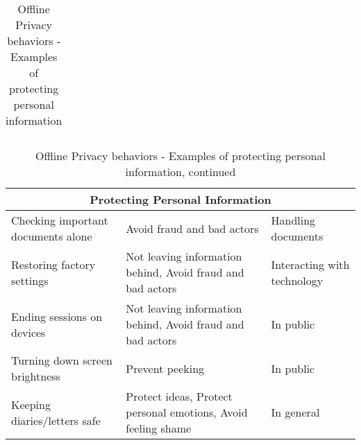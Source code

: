 \begin{table}[H]
\begin{tabular}{ |p{5cm}||p{6cm}|p{4cm}|  }
\end{tabular}
\caption{Offline Privacy behaviors - Examples of protecting personal information}
    \label{tab:meng_t1}
\end{table}

\begin{table}[H]
    \centering
\begin{tabular}{ |p{5cm}||p{6cm}|p{4cm}|  }
\hline
\multicolumn{3}{|c|}{Protecting Personal Information} \\
\hline
\hline
    Checking important documents alone & Avoid fraud and bad actors & Handling documents \\
\hline
    Restoring factory settings & Not leaving information behind, Avoid fraud and bad actors & Interacting with technology \\
\hline
    Ending sessions on devices & Not leaving information behind, Avoid fraud and bad actors & In public \\
\hline
    Turning down screen brightness & Prevent peeking & In public \\
\hline
    Keeping diaries/letters safe & Protect ideas, Protect personal emotions, Avoid feeling shame & In general \\

\hline
\end{tabular}
\caption{Offline Privacy behaviors - Examples of protecting personal information, continued}
    \label{tab:meng_t1}
\end{table}


